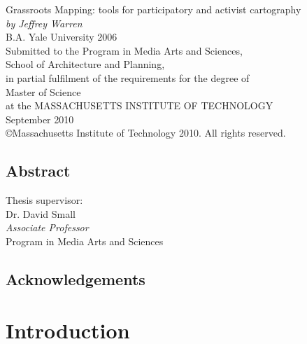 \documentclass[11pt,oneside,notitlepage]{report}
\begin{document}
\date{}
\author{
}
\maketitle

\setlength{\parindent}{0pt}
\setlength{\parskip}{0.8em}

\Large{Grassroots Mapping: tools for participatory and activist cartography \vspace{10px} \\ 
\emph{by Jeffrey Warren}\vspace{10px} \\ 
B.A. Yale University 2006} \vspace{20px} \\ 
\large{Submitted to the Program in Media Arts and Sciences,\\
School of Architecture and Planning,\\
in partial fulfilment of the requirements for the degree of\\
Master of Science\\
at the {\sc MASSACHUSETTS INSTITUTE OF TECHNOLOGY}\\
September 2010\\ 
\copyright Massachusetts Institute of Technology 2010. All rights reserved.}\\ \vspace{20px}

\normalsize{
\section*{Abstract}



}

\vspace{20px}
\large{
Thesis supervisor:\\
Dr. David Small\\
\emph{Associate Professor}\\
Program in Media Arts and Sciences\\
}

\pagebreak

\normalsize{
\section*{Acknowledgements}
}

\tableofcontents

\chapter{Introduction}
\end{document}
